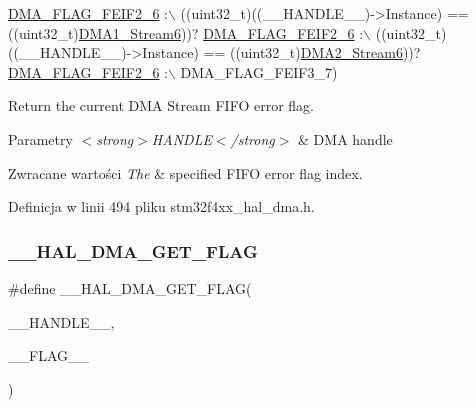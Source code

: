 \begin{DoxyCode}
      \hyperlink{group___d_m_a__flag__definitions_gaba3e6950c089013f9f675b83d78cab5c}{DMA\_FLAG\_FEIF2\_6} :\(\backslash\)
 ((uint32\_t)((\_\_HANDLE\_\_)->Instance) == ((uint32\_t)\hyperlink{group___peripheral__declaration_gac95127480470900755953f1cfe68567d}{DMA1\_Stream6}))? 
      \hyperlink{group___d_m_a__flag__definitions_gaba3e6950c089013f9f675b83d78cab5c}{DMA\_FLAG\_FEIF2\_6} :\(\backslash\)
 ((uint32\_t)((\_\_HANDLE\_\_)->Instance) == ((uint32\_t)\hyperlink{group___peripheral__declaration_ga11a00b283e0911cd427e277e5a314ccc}{DMA2\_Stream6}))? 
      \hyperlink{group___d_m_a__flag__definitions_gaba3e6950c089013f9f675b83d78cab5c}{DMA\_FLAG\_FEIF2\_6} :\(\backslash\)
   DMA\_FLAG\_FEIF3\_7)
\end{DoxyCode}


Return the current D\+MA Stream F\+I\+FO error flag. 


\begin{DoxyParams}{Parametry}
{\em $<$strong$>$\+H\+A\+N\+D\+L\+E$<$/strong$>$} & D\+MA handle \\
\hline
\end{DoxyParams}

\begin{DoxyRetVals}{Zwracane wartości}
{\em The} & specified F\+I\+FO error flag index. \\
\hline
\end{DoxyRetVals}


Definicja w linii 494 pliku stm32f4xx\+\_\+hal\+\_\+dma.\+h.

\mbox{\label{group___d_m_a_ga798d4b3b3fbd32b95540967bb35b35be}} 
\subsubsection{\texorpdfstring{\+\_\+\+\_\+\+H\+A\+L\+\_\+\+D\+M\+A\+\_\+\+G\+E\+T\+\_\+\+F\+L\+AG}{\_\_HAL\_DMA\_GET\_FLAG}}
{\footnotesize\ttfamily \#define \+\_\+\+\_\+\+H\+A\+L\+\_\+\+D\+M\+A\+\_\+\+G\+E\+T\+\_\+\+F\+L\+AG(\begin{DoxyParamCaption}\item[{}]{\+\_\+\+\_\+\+H\+A\+N\+D\+L\+E\+\_\+\+\_\+,  }\item[{}]{\+\_\+\+\_\+\+F\+L\+A\+G\+\_\+\+\_\+ }\end{DoxyParamCaption})}

